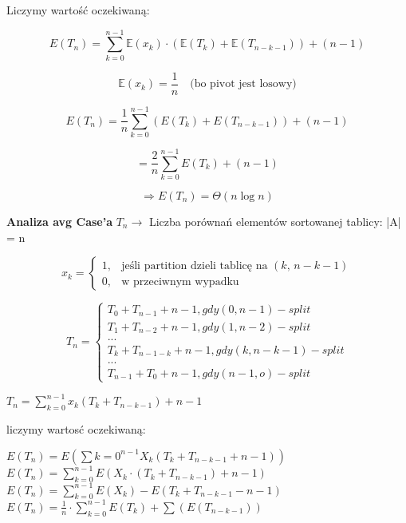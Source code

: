 \documentclass{article}
\begin{document}
\par
Liczymy wartość oczekiwaną:

\[
E(T_n) = \sum_{k=0}^{n-1} \mathbb{E}(x_k) \cdot \left( \mathbb{E}(T_k) + \mathbb{E}(T_{n-k-1}) \right) + (n - 1)
\]

\[
\mathbb{E}(x_k) = \frac{1}{n} \quad \text{(bo pivot jest losowy)}
\]

\[
E(T_n) = \frac{1}{n} \sum_{k=0}^{n-1} \left( E(T_k) + E(T_{n-k-1}) \right) + (n - 1)
\]

\[
= \frac{2}{n} \sum_{k=0}^{n-1} E(T_k) + (n - 1)
\]

\[
\Rightarrow E(T_n) = \Theta(n \log n)
\]

    \vspace{1\baselineskip}
    \textbf{Analiza avg Case'a}
    $T_n \rightarrow$ Liczba porównań elementów sortowanej tablicy: |A| = n \newline

\[
x_k =
\begin{cases}
    1, & \mbox{jeśli partition dzieli tablicę na } (k,\, n - k - 1) \\[0.6em]
    0, & \mbox{w przeciwnym wypadku}
\end{cases}
\]


\[
    T_n =
    \begin{cases}
        T_0 + T_{n-1} + n-1, gdy (0, n-1) -split \\
        T_1 + T_{n-2} + n -1, gdy (1, n-2) -split \\
        ... \\
        T_k + T_{n-1-k} + n - 1, gdy (k, n-k-1) -split \\
        ... \\
        T_{n-1} + T_0 + n - 1, gdy (n-1, o) -split
    \end{cases}
    \]


    $T_n = \sum_{k=0}^{n-1} x_k (T_k + T_{n-k-1}) + n - 1$ \newline
    
    liczymy wartosć oczekiwaną: \newline

    $E(T_n) = E (\sum{k=0}^{n-1} X_k (T_k + T_{n-k-1} + n - 1))$ \newline
    $E(T_n) = \sum_{k=0}^{n-1} E(X_k \cdot (T_k + T_{n-k-1}) + n - 1) $ \newline
    $E(T_n) = \sum_{k=0}^{n-1} E(X_k) - E(T_k + T_{n-k-1} - n - 1)$ \newline
    $E(T_n) = \frac{1}{n} \cdot \sum_{k=0}^{n-1} E(T_k) + \sum (E(T_{n-k-1}))$ \newline
\end{document}
